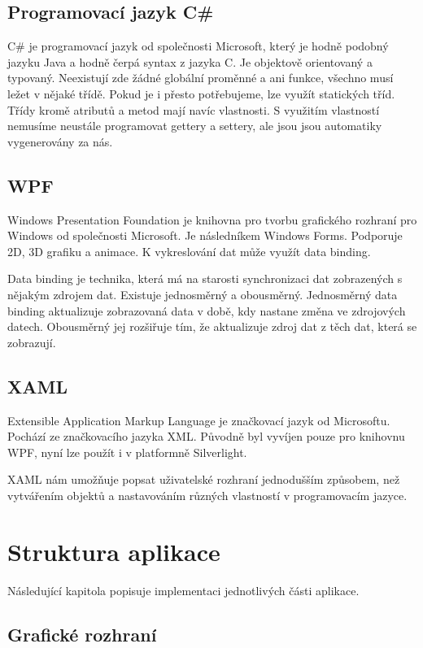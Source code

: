 \documentclass[
  field=inf,
  biblatex,
  glossaries,
  index
]{kidiplom}
\begin{document}
\subsection{Programovací jazyk C\#}
C\# je programovací jazyk od společnosti Microsoft, který je hodně podobný jazyku Java a hodně čerpá syntax z jazyka C. Je objektově orientovaný a typovaný. Neexistují zde žádné globální proměnné a ani funkce, všechno musí ležet v nějaké třídě. Pokud je i přesto potřebujeme, lze využít statických tříd. Třídy kromě atributů a metod mají navíc vlastnosti. S využitím vlastností nemusíme neustále programovat gettery a settery, ale jsou jsou automatiky vygenerovány za nás.

\subsection{WPF}
Windows Presentation Foundation je knihovna pro tvorbu grafického rozhraní pro Windows od společnosti Microsoft. Je následníkem Windows Forms. Podporuje 2D, 3D grafiku a animace. K vykreslování dat může využít data binding. 

Data binding je technika, která má na starosti synchronizaci dat zobrazených s nějakým zdrojem dat. Existuje jednosměrný a obousměrný. Jednosměrný data binding aktualizuje zobrazovaná data v době, kdy nastane změna ve zdrojových datech. Obousměrný jej rozšiřuje tím, že aktualizuje zdroj dat z těch dat, která se zobrazují.

\subsection{XAML}
Extensible Application Markup Language je značkovací jazyk od Microsoftu. Pochází ze značkovacího jazyka XML. Původně byl vyvíjen pouze pro knihovnu WPF, nyní lze použít i v platformně Silverlight.

XAML nám umožňuje popsat uživatelské rozhraní jednodušším způsobem, než vytvářením objektů a nastavováním různých vlastností v programovacím jazyce.




\section{Struktura aplikace}

Následující kapitola popisuje implementaci jednotlivých části aplikace.

\subsection{Grafické rozhraní}
\end{document}

